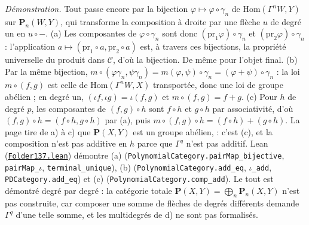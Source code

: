 {\small \emph{Démonstration.} Tout passe encore par la bijection $\varphi \mapsto \varphi \circ \gamma_n$ de $\mathrm{Hom}(\Gamma^n W, Y)$ sur $\mathbf P_n(W, Y)$, qui transforme la composition à droite par une flèche $u$ de degré un en $u \circ -$. (a) Les composantes de $\varphi \circ \gamma_n$ sont donc $(\mathrm{pr}_1 \varphi) \circ \gamma_n$ et $(\mathrm{pr}_2 \varphi) \circ \gamma_n$ : l'application $a \mapsto (\mathrm{pr}_1 \circ a, \mathrm{pr}_2 \circ a)$ est, à travers ces bijections, la propriété universelle du produit dans $\mathcal C$, d'où la bijection. De même pour l'objet final. (b) Par la même bijection, $m \circ (\varphi \gamma_n, \psi \gamma_n) = m (\varphi, \psi) \circ \gamma_n = (\varphi + \psi) \circ \gamma_n$ : la loi $m \circ (f, g)$ est celle de $\mathrm{Hom}(\Gamma^n W, X)$ transportée, donc une loi de groupe abélien ; en degré un, $(\iota f, \iota g) = \iota (f, g)$ et $m \circ (f, g) = f + g$. (c) Pour $h$ de degré $p$, les composantes de $(f, g) \circ h$ sont $f \circ h$ et $g \circ h$ par associativité, d'où $(f, g) \circ h = (f \circ h, g \circ h)$ par (a), puis $m \circ (f, g) \circ h = (f \circ h) + (g \circ h)$. La page tire de a) à c) que $\mathbf P(X, Y)$ est un groupe abélien,  : c'est (c), et la composition n'est pas additive en $h$ parce que $\Gamma^q$ n'est pas additif. Lean (\href{\leanblob/CategoryTheory/Folder137.lean}{\texttt{Folder137.\allowbreak{}lean}}) démontre (a) (\texttt{PolynomialCategory.\allowbreak{}pairMap\_bijective}, \texttt{pairMap\_\(\iota\)}, \texttt{terminal\_unique}), (b) (\texttt{PolynomialCategory.\allowbreak{}add\_eq}, \texttt{\(\iota\)\_add}, \texttt{PDCategory.\allowbreak{}add\_eq}) et (c) (\texttt{PolynomialCategory.\allowbreak{}comp\_add}). Le tout est démontré degré par degré : la catégorie totale $\mathbf P(X, Y) = \bigoplus_n \mathbf P_n(X, Y)$ n'est pas construite, car composer une somme de flèches de degrés différents demande $\Gamma^q$ d'une telle somme, et les multidegrés de d) ne sont pas formalisés.\par}

